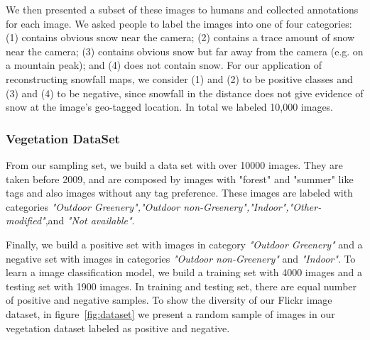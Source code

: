 We then presented a subset of these images to humans and collected
annotations for each image. We asked people to label
the images into one of four categories: (1) contains obvious
snow near the camera; (2) contains a trace amount of snow near
the camera; (3) contains obvious snow but far away from the
camera (e.g. on a mountain peak); and (4) does not contain snow. 
For our application of reconstructing snowfall maps, we consider (1)
and (2) to be positive classes and (3) and (4) to be negative,
since snowfall in the distance does not give evidence of snow
at the image's geo-tagged location. In total we labeled 10,000 images.

\subsubsection{Vegetation DataSet}


From our sampling set, we build a data set with over 10000 images. They are taken before 2009, and are composed by images with "forest" and "summer" like tags and also images without any tag preference. These images are labeled with categories 
\textit{"Outdoor Greenery","Outdoor non-Greenery","Indoor","Other-modified"},and \textit{"Not available"}.

Finally, we build a positive set with images in category \textit{"Outdoor Greenery"} and a negative set 
with images in categories \textit{"Outdoor non-Greenery"} and \textit{"Indoor"}. To learn a image classification model, we build a training set with 4000 images and a testing set with 1900 images. In training and testing set, there are equal number of positive and negative samples.
To show the diversity of our Flickr image dataset, in figure~\ref{fig:dataset} we present a random sample of images in our vegetation dataset labeled as positive and negative.








